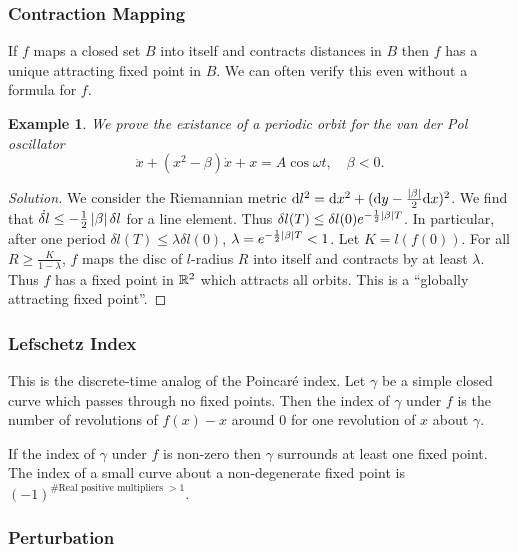 \documentclass{notes}
\theoremstyle{plain}
\newtheorem*{example}{Example}
\begin{document}
\subsubsection*{Contraction Mapping}

If $f$ maps a closed set $B$ into itself and contracts distances in $B$
then $f$ has a unique attracting fixed point in $B$. We can often verify
this even without a formula for $f$.

\begin{example}
  We prove the existance of a periodic orbit for the van der Pol
  oscillator
\[
\ddot{x} + (x^2 - \beta) \dot{x} + x = A \cos \omega t, \quad \beta < 0.
\]
\end{example}

\begin{proof}[Solution]
  We consider the Riemannian metric $\mathrm{d} l^2 = \mathrm{d} x^2 +(\mathrm{d} y -
  \frac{\left|\beta\right|}{2} \mathrm{d} x)^2$.  We find that $\dot{\delta l} \le
  -\frac{1}{2} \left|\beta\right| \delta l$ for a line element.  Thus $\delta
  l(T) \le \delta l(0) e^{-\frac{1}{2} \left|\beta\right| T}$.  In
  particular, after one period $\delta l(T) \le \lambda \delta l(0)$,
  $\lambda = e^{-\frac{1}{2} \left|\beta\right| T} < 1$.  Let $K = l(f(0))$.
  For all $R \ge \frac{K}{1-\lambda}$, $f$ maps the disc of $l$-radius
  $R$ into itself and contracts by at least $\lambda$.  Thus $f$ has a
  fixed point in $\mathbb{R}^2$ which attracts all orbits.  This is a
  ``globally attracting fixed point''.
\end{proof}

\subsubsection*{Lefschetz Index}

This is the discrete-time analog of the Poincar\'e index.  Let $\gamma$
be a simple closed curve which passes through no fixed points.  Then
the index of $\gamma$ under $f$ is the number of revolutions of $f(x) - x$
around $0$ for one revolution of $x$ about $\gamma$.

\vspace{1in}

If the index of $\gamma$ under $f$ is non-zero then $\gamma$ surrounds
at least one fixed point. The index of a small curve about a
non-degenerate fixed point is $\left(-1\right)^{\text{\# Real positive
    multipliers $>1$}}$.

\subsubsection*{Perturbation}
\end{document}
